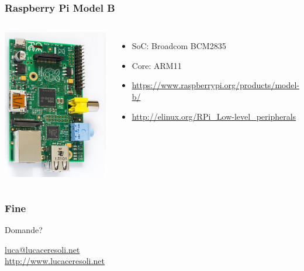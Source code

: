 \documentclass[xetex,table]{beamer}
\begin{document}
\begin{frame}
  \frametitle{Raspberry Pi Model B}
  \begin{columns}
    \includegraphics[width=\textwidth]{images/raspberry-pi-model-b.jpg}
    \begin{itemize}
    \item SoC: Broadcom BCM2835
    \item Core: ARM11
    \item \url{https://www.raspberrypi.org/products/model-b/}
    \item \url{http://elinux.org/RPi_Low-level_peripherals}
    \end{itemize}
  \end{columns}
\end{frame}

\begin{frame}
\frametitle{Fine}

  \begin{center}
    {\Huge Domande?}

    \vspace{0.1\textheight}

    \href{mailto:luca@lucaceresoli.net}{luca@lucaceresoli.net}\\
    \url{http://www.lucaceresoli.net}
  \end{center}
\end{frame}
\end{document}

